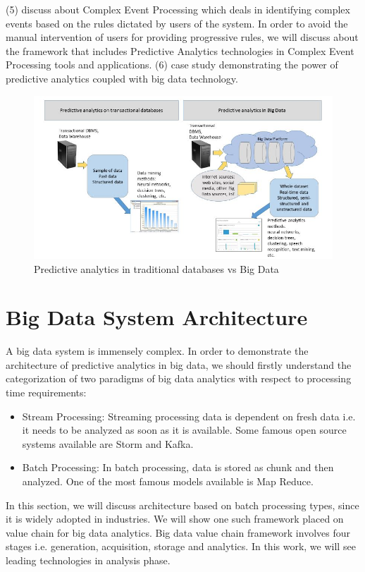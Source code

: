 \documentclass[runningheads]{llncs}
\begin{document}
(5) discuss about Complex Event Processing which deals in identifying complex events based on the rules dictated by users of the system. In order to avoid the manual intervention of users for providing progressive rules, we will discuss about the framework that includes Predictive Analytics technologies in Complex Event Processing tools and applications. \newline
(6) case study demonstrating the power of predictive analytics coupled with big data technology.
\begin{figure}[htbp]
	\centering
	\vspace{-0.85cm}
	\hspace*{-0.45cm}
	\includegraphics[scale=0.6]{Figure3.jpg}
	\caption{Predictive analytics in traditional databases vs Big Data}
	\label{fig:Figure3}
	\vspace{3.5cm}
\end{figure}
\section{Big Data System Architecture}
A big data system is immensely complex. In order to demonstrate the architecture of predictive analytics in big data, we should firstly understand the categorization of two paradigms of big data analytics with respect to processing time requirements:
\begin{itemize}
	\item Stream Processing: Streaming processing data is dependent on fresh data i.e. it needs to be analyzed as soon as it is available. Some famous open source systems available are Storm and Kafka.
	\item Batch Processing: In batch processing, data is stored as chunk and then analyzed. One of the most famous models available is Map Reduce.
\end{itemize}
In this section, we will discuss architecture based on batch processing types, since it is widely adopted in industries. We will show one such framework placed on value chain for big data analytics\cite{5}. Big data value chain framework involves four stages i.e. generation, acquisition, storage and analytics. In this work, we will see leading technologies in analysis phase.
\end{document}
